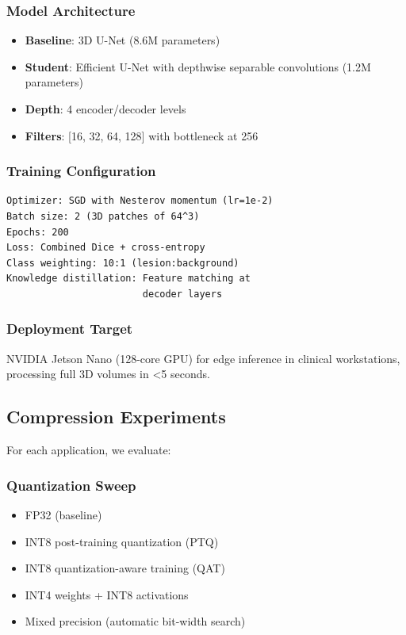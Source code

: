 \subsubsection{Model Architecture}
\begin{itemize}
\item \textbf{Baseline}: 3D U-Net (8.6M parameters)
\item \textbf{Student}: Efficient U-Net with depthwise separable convolutions (1.2M parameters)
\item \textbf{Depth}: 4 encoder/decoder levels
\item \textbf{Filters}: [16, 32, 64, 128] with bottleneck at 256
\end{itemize}

\subsubsection{Training Configuration}
\begin{verbatim}
Optimizer: SGD with Nesterov momentum (lr=1e-2)
Batch size: 2 (3D patches of 64^3)
Epochs: 200
Loss: Combined Dice + cross-entropy
Class weighting: 10:1 (lesion:background)
Knowledge distillation: Feature matching at
                        decoder layers
\end{verbatim}

\subsubsection{Deployment Target}
NVIDIA Jetson Nano (128-core GPU) for edge inference in clinical workstations, processing full 3D volumes in <5 seconds.

\subsection{Compression Experiments}

For each application, we evaluate:

\subsubsection{Quantization Sweep}
\begin{itemize}
\item FP32 (baseline)
\item INT8 post-training quantization (PTQ)
\item INT8 quantization-aware training (QAT)
\item INT4 weights + INT8 activations
\item Mixed precision (automatic bit-width search)
\end{itemize}

